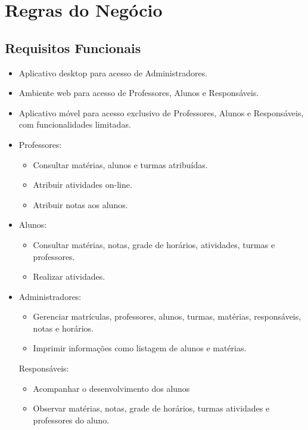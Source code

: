 \documentclass[main.tex]{subfiles}
\begin{document}
\section{Regras do Negócio}

\subsection{Requisitos Funcionais}
\begin{itemize}
    \item Aplicativo desktop para acesso de Administradores.
    \item Ambiente web para acesso de Professores, Alunos e Responsáveis.
    \item Aplicativo móvel para acesso exclusivo de Professores, Alunos e Responsáveis, com funcionalidades limitadas.

    \item Professores:
    \begin{itemize}
        \item Consultar matérias, alunos e turmas atribuídas.
        \item Atribuir atividades on-line.
        \item Atribuir notas aos alunos.
    \end{itemize}

    \item Alunos:
    \begin{itemize}
        \item Consultar matérias, notas, grade de horários, atividades, turmas e professores.
        \item Realizar atividades.
    \end{itemize}

    \item Administradores:
    \begin{itemize}
        \item Gerenciar matrículas, professores, alunos, turmas, matérias, responsáveis, notas e horários.
        \item Imprimir informações como listagem de alunos e matérias.
    \end{itemize}

    Responsáveis:
    \begin{itemize}
        \item Acompanhar o desenvolvimento dos alunos
        \item Observar matérias, notas, grade de horários, turmas atividades e professores do aluno.
    \end{itemize}
\end{itemize}
\end{document}
